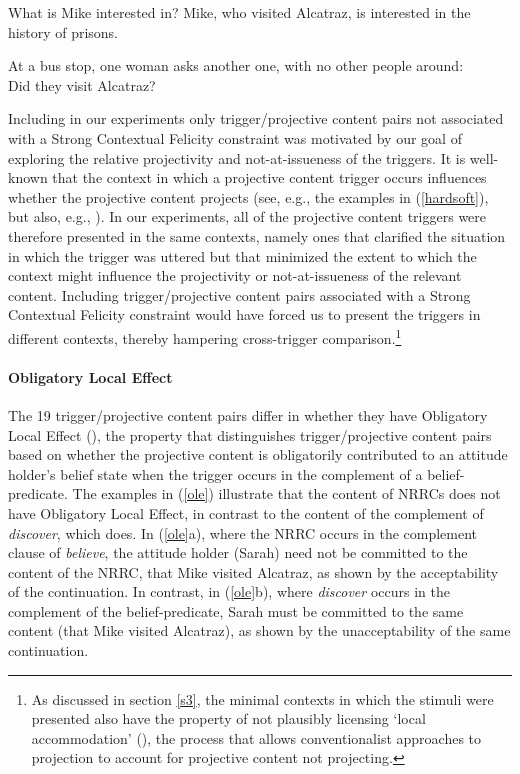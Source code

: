 \documentclass[11pt,fleqn]{article}
\newcommand{\6}{\mbox{$[\hspace*{-.6mm}[$}}
\newcommand{\9}{\mbox{$]\hspace*{-.6mm}]$}}
\def\infelic{{\leavevmode\llap{\#}}}
\begin{document}
\begin{exe}
\begin{xlist}
 What is Mike interested in?
 Mike, who visited Alcatraz, is interested in the history of prisons.
\end{xlist}

\ex\label{scf} At a bus stop, one woman asks another one, with no other people around: \\ \infelic Did they visit Alcatraz?
\end{exe}

Including in our experiments only trigger/projective content pairs not associated with a Strong Contextual Felicity constraint was motivated by our goal of exploring the relative projectivity and not-at-issueness of the triggers. It is well-known that the context in which a projective content trigger occurs influences whether the projective content projects (see, e.g., the examples in (\ref{hardsoft}), but also, e.g., \citealt{simons01,beaver-belly}). In our experiments, all of the projective content triggers were therefore presented in the same contexts, namely ones that clarified the situation in which the trigger was uttered but that minimized the extent to which the context might influence the projectivity or not-at-issueness of the relevant content. Including trigger/projective content pairs associated with a Strong Contextual Felicity constraint would have forced us to present the triggers in different contexts, thereby hampering cross-trigger comparison.\footnote{As discussed in section \ref{s3}, the minimal contexts in which the stimuli were presented also have the property of not plausibly licensing `local accommodation' (\citealt{heim83,vds92}), the process that allows conventionalist approaches to projection to account for projective content not projecting.} 

\paragraph{Obligatory Local Effect} The 19 trigger/projective content pairs differ in whether they have Obligatory Local Effect (\citealt{brst-lang11}), the property that distinguishes trigger/projective content pairs based on whether the projective content is obligatorily contributed to an attitude holder's belief state when the trigger occurs in the complement of a belief-predicate. The examples in (\ref{ole}) illustrate that the content of NRRCs does not have Obligatory Local Effect, in contrast to the content of the complement of {\em discover}, which does. In (\ref{ole}a), where the NRRC occurs in the complement clause of {\em believe}, the attitude holder (Sarah) need not be committed to the content of the NRRC, that Mike visited Alcatraz, as shown by the acceptability of the continuation. In contrast, in (\ref{ole}b), where {\em discover} occurs in the complement of the belief-predicate, Sarah must be committed to the same content (that Mike visited Alcatraz), as shown by the unacceptability of the same continuation. 
\end{document}

